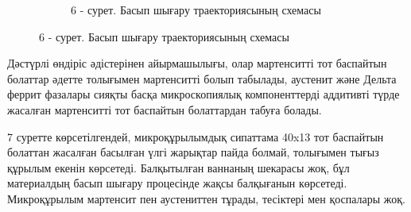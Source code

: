 \begin{figure}[H]
\begin{subfigure}[t]{0.45\textwidth}
        \caption*{6 - сурет. Басып шығару траекториясының схемасы}
    \end{subfigure}
\end{figure}

\begin{multicols}{2}
Дәстүрлі өндіріс әдістерінен айырмашылығы, олар мартенситті тот
баспайтын болаттар әдетте толығымен мартенситті болып табылады, аустенит
және Дельта феррит фазалары сияқты басқа микроскопиялық компоненттерді
аддитивті түрде жасалған мартенситті тот баспайтын болаттардан табуға
болады.

7 суретте көрсетілгендей, микроқұрылымдық сипаттама 40x13 тот баспайтын
болаттан жасалған басылған үлгі жарықтар пайда болмай, толығымен тығыз
құрылым екенін көрсетеді. Балқытылған ваннаның шекарасы жоқ, бұл
материалдың басып шығару процесінде жақсы балқығанын көрсетеді.
Микроқұрылым мартенсит пен аустениттен тұрады, тесіктері мен қоспалары
жоқ.
\end{multicols}

